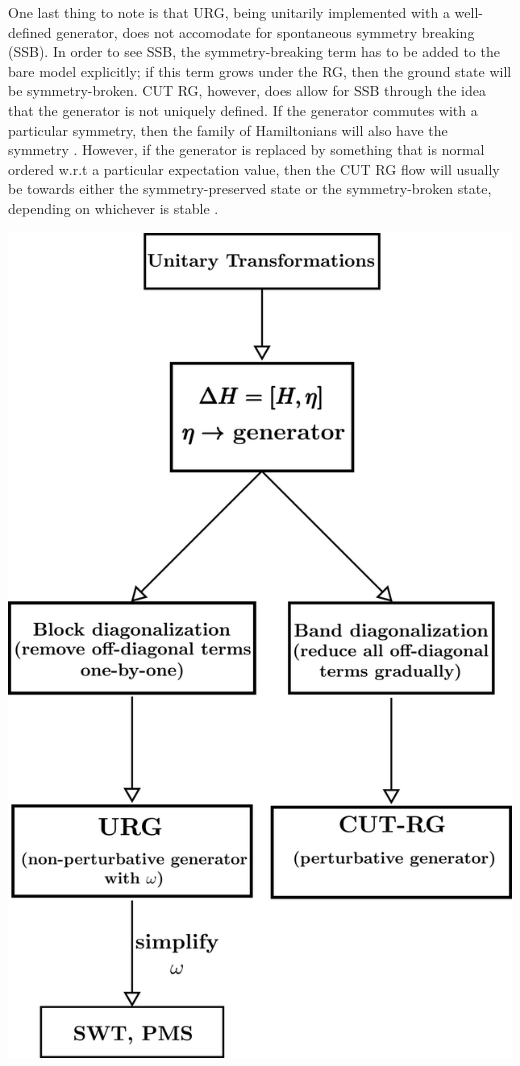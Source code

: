 One last thing to note is that URG, being unitarily implemented with a well-defined generator, does not accomodate for spontaneous symmetry breaking (SSB). In order to see SSB, the symmetry-breaking term has to be added to the bare model explicitly; if this term grows under the RG, then the ground state will be symmetry-broken. CUT RG, however, does allow for SSB through the idea that the generator is not uniquely defined. If the generator commutes with a particular symmetry, then the family of Hamiltonians will also have the symmetry \cite{kehrein}. However, if the generator is replaced by something that is normal ordered w.r.t a particular expectation value, then the CUT RG flow will usually be towards either the symmetry-preserved state or the symmetry-broken state, depending on whichever is stable \cite{wegner_normal}.
\begin{center}
	\includegraphics[scale=0.22]{../figures/unitaries.png}
\end{center}

